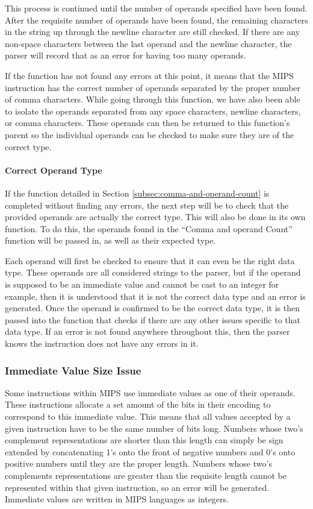 \documentclass[
    paper=letter,
    parskip=half,
    fontsize=12pt,
    titlepage=firstiscover,
    toc=bibliography,
    numbers=endperiod
]{scrartcl}
\begin{document}
This process is continued until the number of operands specified have
been found. After the requisite number of operands have been found, the
remaining characters in the string up through the newline character are
still checked. If there are any non-space characters between the last
operand and the newline character, the parser will record that as an
error for having too many operands.

If the function has not found any errors at this point, it means that
the MIPS instruction has the correct number of operands separated by the
proper number of comma characters. While going through this function, we
have also been able to isolate the operands separated from any space
characters, newline characters, or comma characters. These operands can
then be returned to this function's parent so the individual operands
can be checked to make sure they are of the correct type.

\paragraph{Correct Operand Type}

If the function detailed in Section \ref{subsec:comma-and-operand-count}
is completed without finding any errors, the next step will be to check
that the provided operands are actually the correct type. This will also
be done in its own function. To do this, the operands found in the
``Comma and operand Count'' function will be passed in, as well as their
expected type.

Each operand will first be checked to ensure that it can even be the
right data type. These operands are all considered strings to the
parser, but if the operand is supposed to be an immediate value and
cannot be cast to an integer for example, then it is understood that it
is not the correct data type and an error is generated. Once the operand
is confirmed to be the correct data type, it is then passed into the
function that checks if there are any other issues specific to that data
type. If an error is not found anywhere throughout this, then the parser
knows the instruction does not have any errors in it.

\subsubsection{Immediate Value Size Issue}

Some instructions within MIPS use immediate values as one of their
operands. These instructions allocate a set amount of the bits in their
encoding to correspond to this immediate value. This means that all
values accepted by a given instruction have to be the same number of
bits long. Numbers whose two's complement representations are shorter
than this length can simply be sign extended by concatenating 1's onto
the front of negative numbers and 0's onto positive numbers until they
are the proper length. Numbers whose two's complements representations
are greater than the requisite length cannot be represented within that
given instruction, so an error will be generated. Immediate values are
written in MIPS languages as integers.
\end{document}

